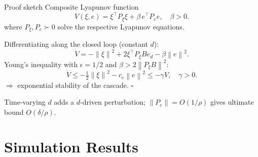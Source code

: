 \documentclass[10pt,aspectratio=169]{beamer}
\newcommand{\norm}[1]{\left\lVert#1\right\rVert}
\begin{document}
\begin{frame}{Proof sketch}
  Composite Lyapunov function
  \begin{equation*}
    V(\xi,e)=\xi^\top P_\xi\xi+\beta\,e^\top P_e e,
    \quad\beta>0.
  \end{equation*}
  where $P_\xi,P_e\succ 0$ solve the respective Lyapunov equations.

  Differentiating along the closed loop (constant $d$):
  \begin{equation*}
    \dot V=-\norm\xi^2+2\xi^\top P_\xi B e_d-\beta\norm e^2.
  \end{equation*}
  Young's inequality with $\epsilon=1/2$ and $\beta>2\norm{P_\xi B}^2$:
  \begin{equation*}
    \dot V\le-\tfrac12\norm\xi^2-c_e\norm e^2\le-\gamma V,\quad
    \gamma>0.
  \end{equation*}
  $\Rightarrow$ exponential stability of the cascade. \hfill $\square$

  \vspace{0.6em}
  Time-varying $d$ adds a $\dot d$-driven perturbation;
  $\norm{P_e}=O(1/\rho)$ gives ultimate bound $O(\delta/\rho)$.
\end{frame}

\section{Simulation Results}
\end{document}
